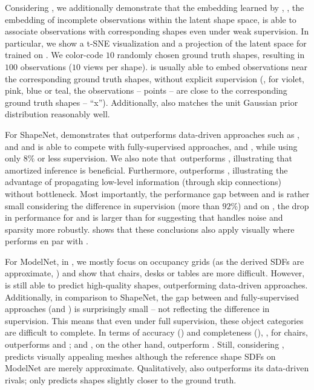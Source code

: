 Considering , we additionally demonstrate that the embedding learned by \AML, \ie, the embedding of incomplete observations within the latent shape space, is able to associate observations with corresponding shapes even under weak supervision. In particular, we show a t-SNE visualization and a projection of the latent space for \AML trained on \clean. We color-code $10$ randomly chosen ground truth shapes, resulting in $100$ observations ($10$ views per shape). \AML is usually able to embed observations near the corresponding ground truth shapes, without explicit supervision (\eg, for violet, pink, blue or teal, the observations -- points -- are close to the corresponding ground truth shapes -- ``x''). Additionally, \AML also matches the unit Gaussian prior distribution reasonably well.

%
For ShapeNet,  demonstrates that \AML outperforms data-driven approaches such as \Engelmann, \ICP and \ML and is able to compete with fully-supervised approaches, \Dai and \Sup, while using only $8\%$ or less supervision. We also note that~\AML outperforms \ML, illustrating that amortized inference is beneficial. Furthermore, \Dai outperforms \Sup, illustrating the advantage of propagating low-level information (through skip connections) without bottleneck. Most importantly, the performance gap between \AML and \Dai is rather small considering the difference in supervision (more than $92\%$) and on \noisy, the drop in performance for \Dai and \Sup is larger than for \AML suggesting that \AML handles noise and sparsity more robustly.  shows that these conclusions also apply visually where \AML performs en par with \Dai.

For ModelNet, in , we mostly focus on occupancy grids (as the derived SDFs are approximate, \cf {}) and show that chairs, desks or tables are more difficult. However, \AML is still able to predict high-quality shapes, outperforming data-driven approaches. Additionally, in comparison to ShapeNet, the gap between \AML and fully-supervised approaches (\Dai and \Sup) is surprisingly small -- not reflecting the difference in supervision. This means that even under full supervision, these object categories are difficult to complete. In terms of accuracy (\Acc) and completeness (\Compl), \eg, for chairs, \AML outperforms \ICP and \ML; \Dai and \Sup, on the other hand, outperform \AML. Still, considering , \AML predicts visually appealing meshes although the reference shape SDFs on ModelNet are merely approximate. Qualitatively, \AML also outperforms its data-driven rivals; only \Dai predicts shapes slightly closer to the ground truth.

